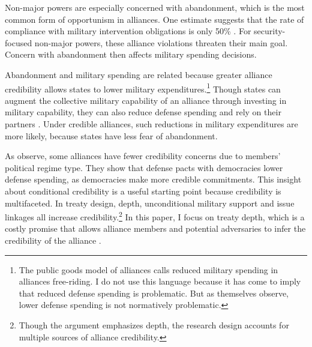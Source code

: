 \documentclass[12pt]{article}
\begin{document}
Non-major powers are especially concerned with abandonment, which is the most common form of opportunism in alliances.
One estimate suggests that the rate of compliance with military intervention obligations is only 50\% \citep{BerkemeierFuhrmann2018}.
For security-focused non-major powers, these alliance violations threaten their main goal. 
Concern with abandonment then affects military spending decisions. 


Abandonment and military spending are related because greater alliance credibility allows states to lower military expenditures.\footnote{The public goods model of alliances calls reduced military spending in alliances free-riding. I do not use this language because it has come to imply that reduced defense spending is problematic. But as \citet[pg. 278]{OlsonZeckhauser1966} themselves observe, lower defense spending is not normatively problematic.}
Though states can augment the collective military capability of an alliance through investing in military capability, they can also reduce defense spending and rely on their partners \citep{OlsonZeckhauser1966, Morrow1993, Conybeare1994, SandlerHartley2001}.
Under credible alliances, such reductions in military expenditures are more likely, because states have less fear of abandonment. 


As \citet{DigiuseppePoast2016} observe, some alliances have fewer credibility concerns due to members' political regime type.
They show that defense pacts with democracies lower defense spending, as democracies make more credible commitments.
This insight about conditional credibility is a useful starting point because credibility is multifaceted. 
In treaty design, depth, unconditional military support \citep{Benson2012, Chibaetal2015} and issue linkages \citep{LongLeeds2006, Poast2012, Poast2013} all increase credibility.\footnote{Though the argument emphasizes depth, the research design accounts for multiple sources of alliance credibility.}
In this paper, I focus on treaty depth, which is a costly promise that allows alliance members and potential adversaries to infer the credibility of the alliance \citep{Leeds2003, FuhrmannSechser2014}. 
\end{document}

